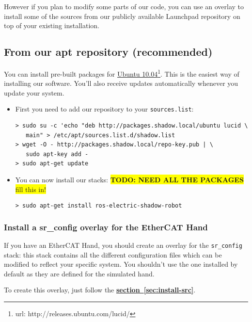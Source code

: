 \documentclass[12pt]{article}
\newcommand{\todo}[1]{\colorbox{yellow}{\textbf{TODO: #1} fill this in!}}
\newcommand{\link}[1]{\hyperref[sec:#1]{\textbf{section~\ref*{sec:#1}}}}
\newcommand{\betterhref}[2]{\href{#1}{#2}\footnote{url: #1}}
\begin{document}
\par However if you plan to modify some parts of our code, you can use an overlay to install some of the sources from our publicly available Launchpad repository on top of your existing installation.

\subsection{From our apt repository (recommended)}
\label{sec:install-apt}
\par You can install pre-built packages for \betterhref{http://releases.ubuntu.com/lucid/}{Ubuntu 10.04}. This is the easiest way of installing our software. You'll also receive updates automatically whenever you update your system.

\begin{itemize}
\item First you need to add our repository to your \texttt{sources.list}:
  \begin{lstlisting}
> sudo su -c 'echo "deb http://packages.shadow.local/ubuntu lucid \
   main" > /etc/apt/sources.list.d/shadow.list
> wget -O - http://packages.shadow.local/repo-key.pub | \
   sudo apt-key add -
> sudo apt-get update
  \end{lstlisting}

\item You can now install our stacks: \todo{NEED ALL THE PACKAGES}
  \begin{lstlisting}
> sudo apt-get install ros-electric-shadow-robot
  \end{lstlisting}

\end{itemize}

\subsubsection{Install a sr\_config overlay for the EtherCAT Hand}
\label{sec:install-cfg}
\par If you have an EtherCAT Hand, you should create an overlay for the \texttt{sr\_config} stack: this stack contains all the different configuration files which can be modified to reflect your specific system. You shouldn't use the one installed by default as they are defined for the simulated hand.\\

\par To create this overlay, just follow the \link{install-src}.
\end{document}
